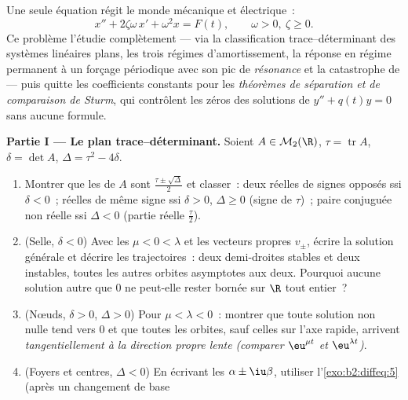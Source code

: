 \begin{problem}\label{pb:b2:diffeq:1}
Une seule équation régit le monde mécanique et électrique~:
\[
x'' + 2\zeta\omega\,x' + \omega^2 x = F(t),
\qquad \omega > 0,\ \zeta \geq 0 .
\]
Ce problème l'étudie complètement --- via la
classification trace--déterminant des systèmes linéaires plans,
les trois régimes d'amortissement, la réponse en régime permanent
à un forçage périodique avec son pic de
\emph{résonance} et la catastrophe de 
--- puis quitte les coefficients constants pour les \emph{théorèmes
de séparation et de comparaison de Sturm}, qui contrôlent les zéros des solutions de
$y'' + q(t)y = 0$ sans aucune formule.

\medskip
\noindent\textbf{Partie I --- Le plan trace--déterminant.} Soient
$A \in \mathcal M_2(\R)$, $\tau = \operatorname{tr}A$, $\delta
= \det A$, $\Delta = \tau^2 - 4\delta$.
\begin{enumerate}
  \item Montrer que les  de $A$ sont
        $\frac{\tau\pm\sqrt\Delta}{2}$ et classer~: deux  réelles de signes opposés ssi $\delta < 0$~;
         réelles de même signe ssi $\delta > 0$,
        $\Delta \geq 0$ (signe de $\tau$)~; paire conjuguée non
        réelle ssi $\Delta < 0$ (partie réelle $\frac\tau2$).
  \item (Selle, $\delta < 0$) Avec les  $\mu < 0
        < \lambda$ et les vecteurs propres $v_\pm$, écrire la
        solution générale et décrire les trajectoires~: deux
        demi-droites stables et deux instables, toutes les autres
        orbites asymptotes aux deux. Pourquoi aucune solution
        autre que $0$ ne peut-elle rester bornée sur $\R$ tout
        entier~?
  \item (Nœuds, $\delta > 0$, $\Delta > 0$) Pour $\mu < \lambda
        < 0$~: montrer que toute solution non nulle tend vers $0$
        et que toutes les orbites, sauf celles sur l'axe rapide,
        arrivent \emph{tangentiellement à la direction propre
        lente} \emph{(comparer $\eu^{\mu t}$ et $\eu^{\lambda
        t}$)}.
  \item (Foyers et centres, $\Delta < 0$) En écrivant les
         $\alpha \pm \iu\beta$, utiliser
        l'\cref{exo:b2:diffeq:5} (après un changement de base

\end{enumerate}
\end{problem}
